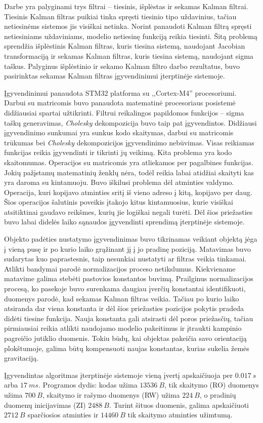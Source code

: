 Darbe yra palyginami trys filtrai -- tiesinis, išplėstas ir sekamas Kalman filtrai.
Tiesinis Kalman filtras puikiai tinka spręsti tiesinio tipo uždavinius, tačiau netiesinėms sistemos jis visiškai netinka.
Norint panaudoti Kalman filtrą spręsti netiesiniams uždaviniams, modelio netiesinę funkciją reikia tiesinti.
Šitą problemą sprendžia išplėstinis Kalman filtras, kuris tiesina sistemą, naudojant Jacobian transformaciją ir sekamas Kalman filtras, kuris tiesina sistemą, naudojant sigma taškus.
Palyginus išplėstinio ir sekamo Kalman filtro darbo rezultatus, buvo pasirinktas sekamas Kalman filtras įgyvendinimui įterptinėje sistemoje.

Įgyvendinimui panaudota STM32 platforma su ,,Cortex-M4'' procesoriumi.
Darbui su matricomis buvo panaudota matematinė procesoriaus posistemė didžiausiai spartai užtikrinti.
Filtrui reikalingos papildomos funkcijos -- sigma taškų generavimas, \textit{Cholesky} dekompozicija buvo taip pat įgyvendintos.
Didžiausi įgyvendinimo sunkumai yra sunkus kodo skaitymas, darbui su matricomis trūkumas bei \textit{Cholesky} dekompozicijos įgyvendinimo nebūvimas.
Visas reikiamas funkcijas reikia įgyvendinti ir tikrinti jų veikimą.
Kita problema yra kodo skaitomumas.
Operacijos su matricomis yra atliekamos per pagalbines funkcijas.
Jokių pažįstamų matematinių ženklų nėra, todėl reikia labai atidžiai skaityti kas yra daroma su kintamuoju.
Buvo iškilusi problema dėl atminties valdymo.
Operacija, kuri kopijavo atminties sritį iš vieno adreso į kitą, kopijavo per daug.
Šios operacijos šalutinis poveikis įtakojo kitus kintamuosius, kurie visiškai atsitiktinai gaudavo reikšmes, kurių jie logiškai negali turėti.
Dėl šios priežasties buvo labai didelės laiko sąnaudos įgyvendinti sprendimą įterptinėje sistemoje.

Objekto padėties nustatymo įgyvendinimas buvo tikrinamas veikiant objektą jėga į vieną pusę ir po kurio laiko grąžinant jį į jo pradinę poziciją.
Matavimas buvo sudarytas kuo paprastesnis, taip nesunkiai nustatyti ar filtras veikia tinkamai.
Atlikti bandymai parodė normalizacijos proceso netikslumus.
Kiekviename matavime galima stebėti pastovios konstantos buvimą.
Prailginus normalizacijos procesą, ko pasekoje buvo surenkama daugiau įverčių konstantai identifikuoti, duomenys parodė, kad sekamas Kalman filtras veikia.
Tačiau po kurio laiko atsiranda dar viena konstanta ir dėl šios priežasties pozicijos pokytis pradeda didėti tiesine funkcija.
Nauja konstanta gali atsirasti dėl poros priežasčių, tačiau pirmiausiai reikia atlikti naudojamo modelio pakeitimus ir įtraukti kampinio pagreičio jutiklio duomenis.
Tokiu būdų, kai objektas pakeičia savo orientaciją plokštumoje, galima būtų kompensuoti naujas konstantas, kurias sukelia žemės gravitaciją.

Įgyvendintas algoritmas įterptinėje sistemoje vieną įvertį apskaičiuoja per $0.017~s$ arba $17~ms$.
Programos dydis: kodas užima $13536~B$, tik skaitymo (RO) duomenys užima $700~B$, skaitymo ir rašymo duomenys (RW) užima $224~B$, o pradinių duomenų inicijavimas (ZI) $2488~B$.
Turint šituos duomenis, galima apskaičiuoti $2712~B$ sparčiosios atminties ir $14460~B$ tik skaitymo atminties užimtumą.


